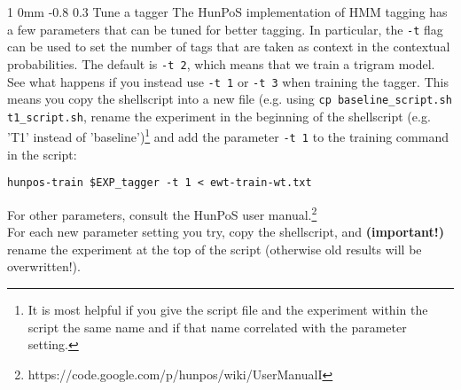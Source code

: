 \documentclass[11pt]{article}
\makeatletter
\newcommand{\newsec}[2]{\section{#1}\label{sec:#2}\noindent}
\renewcommand{\section}{\@startsection
{section}%
{1}%
{0mm}%
{-0.8\baselineskip}%
{0.3\baselineskip}%
{\bfseries\large}}%
\makeatother
\begin{document}
\newsec{Tune a tagger}{tune}%
The HunPoS implementation of HMM tagging has a few parameters that can
be tuned for better tagging. In particular, the {\tt -t} flag can be
used to set the number of tags that are taken as context in the
contextual probabilities. The default is {\tt -t
  $\!\!$2}, which means that we train a trigram model. See what
happens if you instead use {\tt -t $\!\!$1} or {\tt -t
  $\!\!$3} when training the tagger. This means you copy the
shellscript into a new file (e.g. using \texttt{cp baseline\_script.sh
  t1\_script.sh}, rename the experiment in the beginning of the
shellscript (e.g. 'T1' instead of 'baseline')\footnote{It is most
  helpful if you give the script file and the experiment within the
  script the same name and if that name correlated with the parameter
  setting.} and add the parameter \texttt{-t 1} to the training
command in the script:
\begin{verbatim}
hunpos-train $EXP_tagger -t 1 < ewt-train-wt.txt
\end{verbatim}
For other parameters, consult the HunPoS user manual.\footnote{https://code.google.com/p/hunpos/wiki/UserManualI}\\
For each new parameter setting you try, copy the shellscript, and
\textbf{(important!)} rename the experiment at the top of the script
(otherwise old results will be overwritten!).


\end{document}
